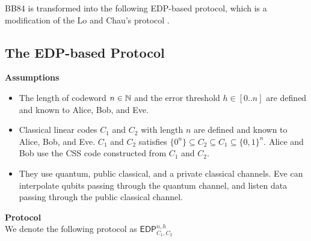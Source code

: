 BB84 is transformed into the following EDP-based protocol,
which is a modification of the Lo and Chau's protocol
\cite{LoChau1999}.

\subsection{The EDP-based Protocol}
\label{pre:EDPbased}
{\bf Assumptions}
\begin{itemize}
 \item The length of codeword $n \in \mathbb{N}$ and the error threshold 
       $h \in [0..n]$ are
       defined and known to Alice, Bob, and Eve.
 \item Classical linear codes $C_1$ and $C_2$ with length $n$ are
       defined and known to Alice, Bob, and Eve. 
       $C_1$ and $C_2$ satisfies 
       $\{0^n\} \subseteq C_2 \subseteq C_1 \subseteq \{0,1\}^n$.
       Alice and Bob use the CSS code constructed from 
       $C_1$ and $C_2$.
 \item They use quantum, public classical, and a private classical
       channels. Eve can interpolate qubits passing
       through the quantum channel, and listen data passing 
       through the public classical channel.
\end{itemize}
{\bf Protocol}\\
We denote the following protocol as $\mathsf{EDP}^{n,h}_{C_1,C_2}$
